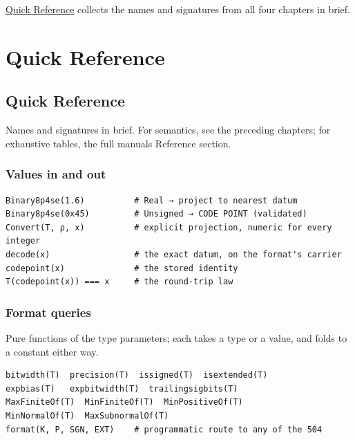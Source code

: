 \href{reference.md}{Quick Reference} collects the names and signatures from all four chapters in brief.



\part{Quick Reference}


\chapter{Quick Reference}



\label{10518953264959401364}{}


Names and signatures in brief. For semantics, see the preceding chapters; for exhaustive tables, the full manual{\textquotesingle}s Reference section.



\section{Values in and out}



\label{6161161780416834527}{}



\begin{verbatim}
Binary8p4se(1.6)          # Real → project to nearest datum
Binary8p4se(0x45)         # Unsigned → CODE POINT (validated)
Convert(T, ρ, x)          # explicit projection, numeric for every integer
decode(x)                 # the exact datum, on the format's carrier
codepoint(x)              # the stored identity
T(codepoint(x)) === x     # the round-trip law
\end{verbatim}



\section{Format queries}



\label{11700971017834573131}{}


Pure functions of the type parameters; each takes a type or a value, and folds to a constant either way.




\begin{verbatim}
bitwidth(T)  precision(T)  issigned(T)  isextended(T)
expbias(T)   expbitwidth(T)  trailingsigbits(T)
MaxFiniteOf(T)  MinFiniteOf(T)  MinPositiveOf(T)
MinNormalOf(T)  MaxSubnormalOf(T)
format(K, P, SGN, EXT)    # programmatic route to any of the 504
\end{verbatim}



